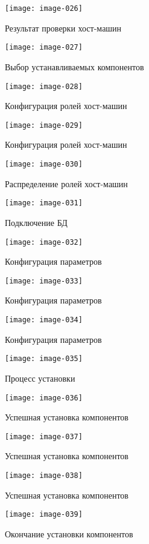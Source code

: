 \newpage

\begin{figure}[ht!]
    \center
    \texttt{[image: image-026]}
    \caption{Результат проверки хост-машин}
    \texttt{[image: image-027]}
    \caption{Выбор устанавливаемых компонентов}
\end{figure}

\newpage

\begin{figure}[ht!]
    \center
    \texttt{[image: image-028]}
    \caption{Конфигурация ролей хост-машин}
    \texttt{[image: image-029]}
    \caption{Конфигурация ролей хост-машин}
\end{figure}

\newpage

\begin{figure}[ht!]
    \center
    \texttt{[image: image-030]}
    \caption{Распределение ролей хост-машин}
    \texttt{[image: image-031]}
    \caption{Подключение БД}
    \texttt{[image: image-032]}
    \caption{Конфигурация параметров}
\end{figure}

\newpage

\begin{figure}[ht!]
    \center
    \texttt{[image: image-033]}
    \caption{Конфигурация параметров}
    \texttt{[image: image-034]}
    \caption{Конфигурация параметров}
\end{figure}

\newpage

\begin{figure}[ht!]
    \center
    \texttt{[image: image-035]}
    \caption{Процесс установки}
    \texttt{[image: image-036]}
    \caption{Успешная установка компонентов}
\end{figure}

\newpage

\begin{figure}[ht!]
    \center
    \texttt{[image: image-037]}
    \caption{Успешная установка компонентов}
    \texttt{[image: image-038]}
    \caption{Успешная установка компонентов}
\end{figure}

\newpage

\begin{figure}[ht!]
    \center
    \texttt{[image: image-039]}
    \caption{Окончание установки компонентов}
\end{figure}

